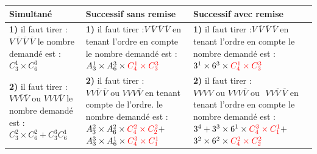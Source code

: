 \documentclass[12pt,a4paper]{article}
\begin{document}
\begin{enumerate}[label=\Roman*., font=\bfseries\color{red}]
\raggedright
\begin{tabular}{|p{6cm}|p{6cm}|p{5cm}|}
\hline
\textbf{Simultané} & \textbf{Successif sans remise} & \textbf{Successif avec remise}\\
\hline
\makecell[l]{\textbf{1)} il faut tirer : $V \ \overline{V} \ \overline{V} \ \overline{V}$\\ le nombre demandé est :$C_3^1 \times C_6^3 $} & \makecell[l]{\textbf{1)} il faut tirer :$ V \ \overline{V} \ \overline{V} \ \overline{V}$\\ en tenant l'ordre en compte\\ le nombre demandé est :\\$ A_3^1 \times A_6^3 \times \color{red} C_4^1 \times C_3^3$} & \makecell[l]{\textbf{1)} il faut tirer :$ V \ \overline{V} \ \overline{V} \ \overline{V}$\\ en tenant l'ordre en compte\\ le nombre demandé est :\\$ 3^1 \times 6^3 \times \color{red} C_4^1 \times C_3^3 $} \\
\hline
\makecell[l]{\textbf{2)} il faut tirer :\\ $V V \overline{V} \overline{V} \text{ ou } V V V \overline{V}$\\ le nombre demandé est :\\$ C_3^2 \times C_6^2 + C_3^3 C_6^1 $} & \makecell[l]{\textbf{2)} il faut tirer : $V V \overline{V} \ \overline{V} \text{ ou } V V V \overline{V}$\\ en tenant compte de l'ordre.\\ le nombre demandé est :\\$ A_3^2 \times A_6^2 \times \color{red} C_4^2 \times C_2^2 \color{black} +$ \\$ A_3^3 \times A_6^1 \times \color{red} C_4^3 \times C_1^1 $} & \makecell[l]{\textbf{2)} il faut tirer :\\$ V V V V \text{ ou } V V V \overline{V} \text{ ou }$\\$ V V \overline{V} \ \overline{V} $\\ en tenant l'ordre en compte\\ le nombre demandé est :\\$ 3^4 + 3^3 \times 6^1 \times \color{red} C_4^3 \times C_1^1 \color{black} + $\\$3^2 \times 6^2 \times \color{red} C_4^2 \times C_2^2$} \\
\hline

\end{tabular}
\end{enumerate}
\end{document}
